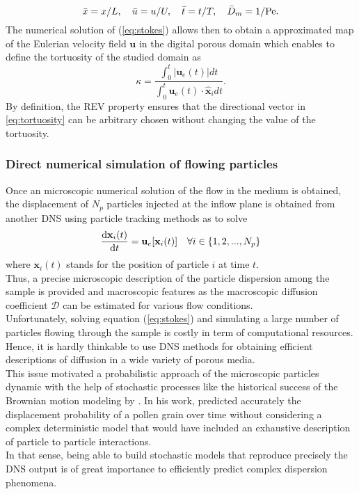 \begin{equation}
\bar{x}=x/L,\quad \bar{u}=u/U,\quad \bar{t}=t/T,\quad \bar{D}_m=1/\mathrm{Pe}.
\end{equation}
The numerical solution of (\ref{eq:stokes}) allows then to obtain a approximated map of the Eulerian velocity field $\textbf{u}$ in the digital porous domain which enables to define the tortuosity of the studied domain as
\begin{equation}\label{eq:tortuosity}
\kappa=\frac{\int_0^t|\textbf{u}_e(t)|dt}{\int_0^t \textbf{u}_e(t)\cdot\hat{\textbf{x}}_idt}.
\end{equation}
By definition, the REV property ensures that the directional vector in \eqref{eq:tortuosity} can be arbitrary chosen without changing the value of the tortuosity.\\

\subsubsection{Direct numerical simulation of flowing particles}
Once an microscopic numerical solution of the flow in the medium is obtained, the displacement of $N_p$ particles injected at the inflow plane is obtained from another DNS using particle tracking methods as \citet{Pollock1988} to solve
\begin{equation}\label{eq:traject}
\dv{\textbf{x}_i(t)}{t}=\textbf{u}_e[\textbf{x}_i(t)]\quad\forall i\in\{1,2,...,N_p\}
\end{equation}
where $\textbf{x}_i(t)$ stands for the position of particle $i$ at time $t$.\\
Thus, a precise microscopic description of the particle dispersion among the sample is provided and macroscopic features as the macroscopic diffusion coefficient $\mathcal{D}$ can be estimated for various flow conditions.\\
Unfortunately, solving equation (\ref{eq:stokes}) and simulating a large number of particles flowing through the sample is costly in term of computational resources. Hence, it is hardly thinkable to use DNS methods for obtaining efficient descriptions of diffusion in a wide variety of porous media.\\
This issue motivated a probabilistic approach of the microscopic particles dynamic with the help of stochastic processes like the historical success of the Brownian motion modeling by \citet{Einstein1906}. 
In his work, \citeauthor{Einstein1906} predicted accurately the displacement probability of a pollen grain over time without considering a complex deterministic model that would have included an exhaustive description of particle to particle interactions.\\
In that sense, being able to build stochastic models that reproduce precisely the DNS output is of great importance to efficiently predict complex dispersion phenomena.

